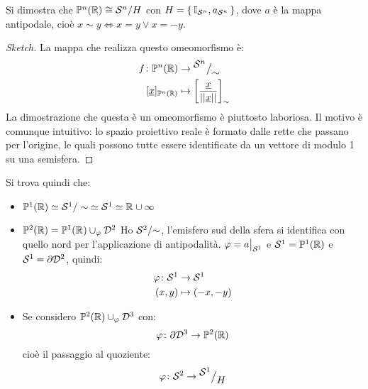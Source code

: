 \begin{lemma}
  Si dimostra che $ \mathbb{P}^{n} (\mathbb{R}) \cong {\mathcal{S}^{n}} \slash {H} $ con $ H = \set{\mathbb{I}_{\mathcal{S}^{n}}, a_{\mathcal{S}^{n}}} $, dove
  $ a $ è la mappa antipodale, cioè $ x \sim y \iff x = y \vee x = - y $.
\end{lemma}
\begin{proof}[Sketch]
  La mappa che realizza questo omeomorfismo è:
  \begin{align*}
    f \colon \Pjr{n} & \to \quot{\Sph{n}}{\sim}\\
    [\vec{x}]_{\Pjr{n}} & \mapsto \left[\frac{\vec{x}}{||\vec{x}||}\right]_\sim
  \end{align*}
  La dimostrazione che questa è un omeomorfismo è piuttosto laboriosa. Il motivo è
  comunque intuitivo: lo spazio proiettivo reale è formato dalle rette che passano
  per l'origine, le quali possono tutte essere identificate da un vettore di modulo
  1 su una semisfera.
\end{proof}
\eproof
Si trova quindi che:
\begin{itemize}
\item $ \mathbb{P}^{1} (\mathbb{R}) \simeq \mathcal{S}^{1} \slash \sim \; \simeq \mathcal{S}^{1} \simeq \mathbb{R}^{} \cup {\infty} $
\item $ \mathbb{P}^{2} (\mathbb{R}) = \mathbb{P}^1(\mathbb{R}^{}) \cup_\varphi \mathcal{D}^{2} $
  Ho $ {\mathcal{S}^{2}} \slash {\sim} $, l'emisfero sud della sfera si identifica con quello
  nord per l'applicazione di antipodalità.
  $ \varphi = a \big \lvert_{\mathcal{S}^{1}} $ e $ \mathcal{S}^{1} = \mathbb{P}^{1} (\mathbb{R}) $ e $ \mathcal{S}^{1} = \partial \mathcal{D}^{2} $,
  quindi:
  \begin{align*}
    \varphi \colon \mathcal{S}^{1} & \to \mathcal{S}^{1} \\
    (x,y) & \mapsto (-x,-y)
  \end{align*}
\item Se considero $ \mathbb{P}^{2} (\mathbb{R}) \cup_\varphi \mathcal{D}^{3} $ con:
  \[
    \varphi \colon \partial \mathcal{D}^{3}  \to \mathbb{P}^{2} (\mathbb{R})
  \]
  cioè il passaggio al quoziente:
  \[
    \varphi \colon \mathcal{S}^{2}  \to {^{\textstyle \mathcal{S}^{1}}\big/_{\textstyle H}}
  \]
\end{itemize}

